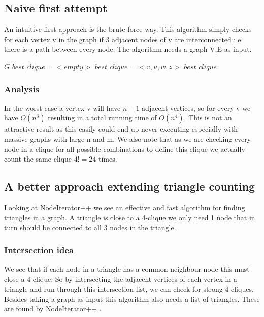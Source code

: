 \documentclass{article}
\begin{document}
\subsection{Naive first attempt}
An intuitive first approach is the brute-force way. This algorithm simply checks for each vertex v in the graph if 3 adjacent nodes of v are interconnected i.e. there is a path between every node. The algorithm needs a graph V,E as input.

\begin{algorithm}
\caption{$strong\_4clique\_finder$}
\begin{algorithmic}
\REQUIRE $G$
\STATE $best\_clique = <empty>$
\STATE $best\_clique = <v,u,w,z>$
\ENDIF
\ENDIF
\ENDFOR
\ENDIF
\ENDFOR
\ENDFOR
\ENDFOR
\RETURN $best\_clique$
\end{algorithmic}
\end{algorithm}

\subsubsection{Analysis}
In the worst case a vertex v will have $n-1$ adjacent vertices, so for every v we have $O(n^{3})$ resulting in a total running time of $O(n^{4})$. This is not an attractive result as this easily could end up never executing especially with massive graphs with large n and m. We also note that as we are checking every node in a clique for all possible combinations to define this clique we actually count the same clique $4! = 24$ times.

\subsection{A better approach extending triangle counting}
Looking at NodeIterator++ \cite{countingTriangles} we see an effective and fast algorithm for finding triangles in a graph. A triangle is close to a 4-clique we only need 1 node that in turn should be connected to all 3 nodes in the triangle.

\subsubsection{Intersection idea}
We see that if each node in a triangle has a common neighbour node this must close a 4-clique. So by intersecting the adjacent vertices of each vertex in a triangle and run through this intersection list, we can check for strong 4-cliques. Besides taking a graph as input this algorithm also needs a list of triangles. These are found by NodeIterator++ \cite{countingTriangles}.
\end{document}
